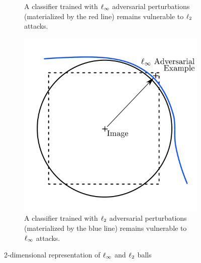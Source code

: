 \begin{figure}
\begin{subfigure}[t]{0.32\textwidth}
       \caption{A classifier trained with $\ell_\infty $ adversarial perturbations  (materialized by the red line) remains vulnerable to $\ell_2 $ attacks.}
       \label{figure:ap4-ball_adversarial_l2}
   \end{subfigure}
   \hfill
   \begin{subfigure}[t]{0.32\textwidth}
       \centering
       \includegraphics[scale=0.22]{figures/appendix/ap4-advocating_for_multiple_defense_strategies/ball_adversarial_linf.pdf}
       \caption{A classifier trained with $\ell_2 $ adversarial perturbations (materialized by the blue line) remains vulnerable to $\ell_\infty $ attacks.}
       \label{figure:ap4-ball_adversarial_linf}
   \end{subfigure}
   \caption{2-dimensional representation of $\ell_\infty $ and $\ell_2 $ balls}
\end{figure}


